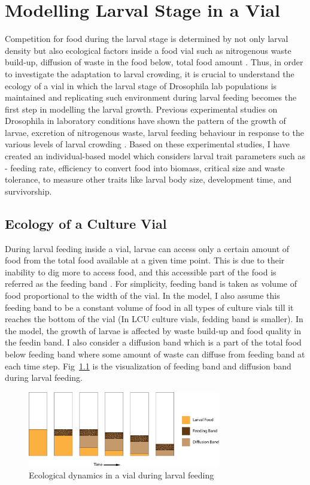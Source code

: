 \chapter{Modelling Larval Stage in a Vial}
Competition for food during the larval stage is determined by not only larval density but also ecological factors inside a food vial such as nitrogenous waste build-up, diffusion of waste in the food below, total food amount \citep{sarangiEcologicalDetailsMediate2018}. Thus, in order to investigate the adaptation to larval crowding, it is crucial to understand the ecology of a vial in which the larval stage of Drosophila lab populations is maintained and replicating such environment during larval feeding becomes the first step in modelling the larval growth. Previous experimental studies on Drosophila in laboratory conditions have shown the pattern of the growth of larvae, excretion of nitrogenous waste, larval feeding behaviour in response to the various levels of larval crowding \citep{sarangiEcologicalDetailsMediate2018}. Based on these experimental studies, I have created an individual-based model which considers larval trait parameters such as - feeding rate, efficiency to convert food into biomass, critical size and waste tolerance, to measure other traits like larval body size, development time, and survivorship.
\section{Ecology of a Culture Vial}
During larval feeding inside a vial, larvae can access only a certain amount of food from the total food available at a given time point. This is due to their inability to dig more to access food, and this accessible part of the food is referred as the feeding band \citep{godoy-herreraInterIntrapopulationalVariation1977,sarangiEcologicalDetailsMediate2018}. For simplicity, feeding band is taken as volume of food proportional to the width of the vial. In the model, I also assume this feeding band to be a constant volume of food in all types of culture vials till it reaches the bottom of the vial (In LCU culture vials, fedding band is smaller). In the model, the growth of larvae is affected by waste build-up and food quality in the feedin band. I also consider a diffusion band which is a part of the total food below feeding band where some amount of waste can diffuse from feeding band at each time step. Fig~\ref{fig:vial} is the visualization of feeding band and diffusion band during larval feeding.

\begin{figure}[h]
  \centering
  \includegraphics[width=0.75\textwidth]{C2/Figs/vial_diagram.png}
  \caption{Ecological dynamics in a vial during larval feeding}
  \label{fig:vial}
\end{figure}

